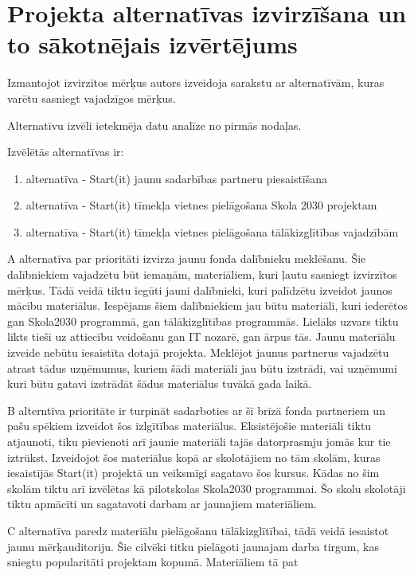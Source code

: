 \section{Projekta alternatīvas izvirzīšana un to sākotnējais izvērtējums}
Izmantojot izvirzītos mērķus autors izveidoja sarakstu ar alternatīvām, kuras varētu sasniegt vajadzīgos
mērķus.
\par
Alternatīvu izvēli ietekmēja datu analīze no pirmās nodaļas.
\par
Izvēlētās alternatīvas ir:
\renewcommand{\labelenumi}{\Alph{enumi}}
\begin{enumerate}
    \item alternatīva - Start(it) jaunu sadarbības partneru piesaistīšana
    \item alternatīva - Start(it) tīmekļa vietnes pielāgošana Skola 2030 projektam
    \item alternatīva - Start(it) tīmekļa vietnes pielāgošana tālākizglītības vajadzībām
\end{enumerate}
\renewcommand{\labelenumi}{\arabic{enumi}}
\par
A alternatīva par prioritāti izvirza jaunu fonda dalībnieku meklēšanu. Šie dalībniekiem vajadzētu būt
iemaņām, materiāliem, kuri ļautu sasniegt izvirzītos mērķus. Tādā veidā tiktu iegūti jauni dalībnieki,
kuri palīdzētu izveidot jaunos mācību materiālus. Iespējams šiem dalībniekiem jau būtu materiāli, kuri
iederētos gan Skola2030 programmā, gan tālākizglītības programmās. Lielāks uzvars tiktu likts tieši uz 
attiecību veidošanu gan IT nozarē, gan ārpus tās. Jaunu materiālu izveide nebūtu iesaistīta dotajā projekta.
Meklējot jaunus partnerus vajadzētu atrast tādus uzņēmumus, kuriem šādi materiāli jau būtu izstrādi, vai
uzņēmumi kuri būtu gatavi izstrādāt šādus materiālus tuvākā gada laikā.
\par
B alterntīva prioritāte ir turpināt sadarboties ar šī brīzā fonda partneriem un pašu spēkiem izveidot šos
izlgītības materiālus. Eksistējošie materiāli tiktu atjaunoti, tiku pievienoti arī jaunie materiāli tajās 
datorprasmju jomās kur tie iztrūkst. Izveidojot šos materiālus kopā ar skolotājiem no tām skolām, kuras
iesaistījās Start(it) projektā un veiksmīgi sagatavo šos kursus. Kādas no šim skolām tiktu arī izvēlētas kā 
pilotskolas Skola2030 programmai. Šo skolu skolotāji tiktu apmācīti un sagatavoti darbam ar jaunajiem materiāliem.
\par
C alternatīva paredz materiālu pielāgošanu tālākizglītībai, tādā veidā iesaistot jaunu mērķauditoriju. Šie
cilvēki titku pielāgoti jaunajam darba tirgum, kas sniegtu popularitāti projektam kopumā. Materiāliem tā pat
